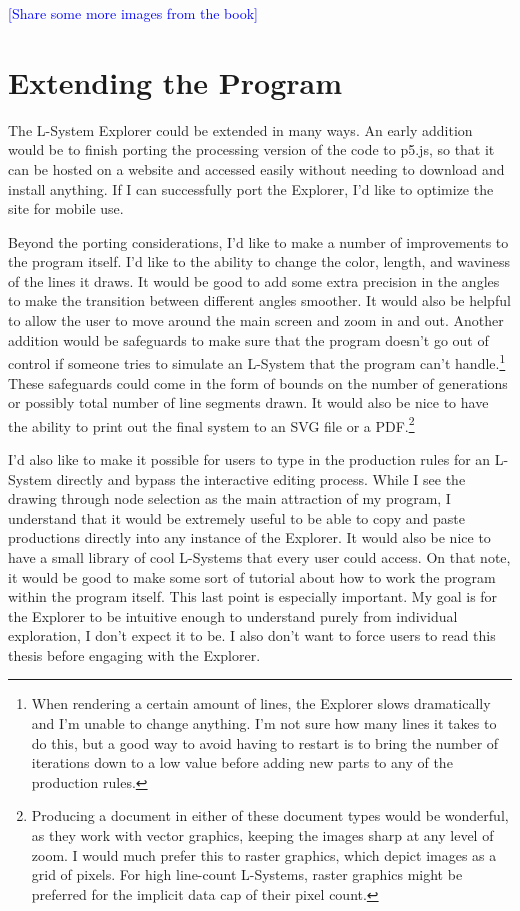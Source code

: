 \documentclass[12pt,twoside]{reedthesis}
\begin{document}
	\textcolor{blue}{[Share some more images from the book]}
	
\section{Extending the Program}
\label{Extensions}

	The L-System Explorer could be extended in many ways. An early addition would be to finish porting the processing version of the code to p5.js, so that it can be hosted on a website and accessed easily without needing to download and install anything. If I can successfully port the Explorer, I'd like to optimize the site for mobile use.
	
	Beyond the porting considerations, I'd like to make a number of improvements to the program itself. I'd like to the ability to change the color, length, and waviness of the lines it draws. It would be good to add some extra precision in the angles to make the transition between different angles smoother. It would also be helpful to allow the user to move around the main screen and zoom in and out. Another addition would be safeguards to make sure that the program doesn't go out of control if someone tries to simulate an L-System that the program can't handle.\footnote{When rendering a certain amount of lines, the Explorer slows dramatically and I'm unable to change anything. I'm not sure how many lines it takes to do this, but a good way to avoid having to restart is to bring the number of iterations down to a low value before adding new parts to any of the production rules.} These safeguards could come in the form of bounds on the number of generations or possibly total number of line segments drawn. It would also be nice to have the ability to print out the final system to an SVG file or a PDF.\footnote{Producing a document in either of these document types would be wonderful, as they work with vector graphics, keeping the images sharp at any level of zoom. I would much prefer this to raster graphics, which depict images as a grid of pixels. For high line-count L-Systems, raster graphics might be preferred for the implicit data cap of their pixel count.} 
	
	I'd also like to make it possible for users to type in the production rules for an L-System directly and bypass the interactive editing process. While I see the drawing through node selection as the main attraction of my program, I understand that it would be extremely useful to be able to copy and paste productions directly into any instance of the Explorer. It would also be nice to have a small library of cool L-Systems that every user could access. On that note, it would be good to make some sort of tutorial about how to work the program within the program itself. This last point is especially important. My goal is for the Explorer to be intuitive enough to understand purely from individual exploration, I don't expect it to be. I also don't want to force users to read this thesis before engaging with the Explorer.
	
\end{document}
